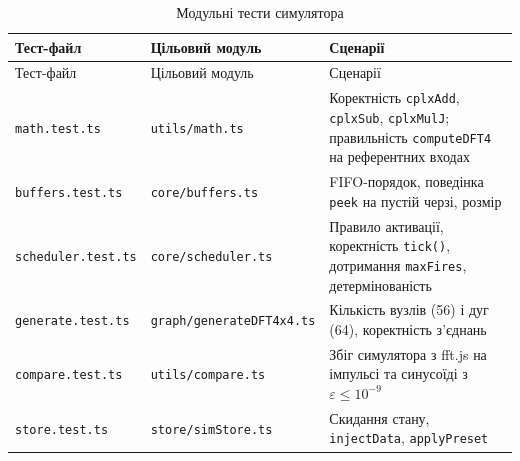 \begin{longtable}[]{@{}
  >{\raggedright\arraybackslash}p{}
  >{\raggedright\arraybackslash}p{}
  >{\raggedright\arraybackslash}p{}@{}}
\caption[Модульні тести симулятора]{Модульні тести симулятора}\tabularnewline
\toprule\noalign{}
\begin{minipage}[b]{\linewidth}\raggedright
Тест-файл
\end{minipage} & \begin{minipage}[b]{\linewidth}\raggedright
Цільовий модуль
\end{minipage} & \begin{minipage}[b]{\linewidth}\raggedright
Сценарії
\end{minipage} \\
\midrule\noalign{}
\endfirsthead
\toprule\noalign{}
\begin{minipage}[b]{\linewidth}\raggedright
Тест-файл
\end{minipage} & \begin{minipage}[b]{\linewidth}\raggedright
Цільовий модуль
\end{minipage} & \begin{minipage}[b]{\linewidth}\raggedright
Сценарії
\end{minipage} \\
\midrule\noalign{}
\endhead
\bottomrule\noalign{}
\endlastfoot
\texttt{math.test.ts} & \texttt{utils/math.ts} & Коректність
\texttt{cplxAdd}, \texttt{cplxSub}, \texttt{cplxMulJ}; правильність
\texttt{computeDFT4} на референтних входах \\
\texttt{buffers.test.ts} & \texttt{core/buffers.ts} & FIFO-порядок,
поведінка \texttt{peek} на пустій черзі, розмір \\
\texttt{scheduler.test.ts} & \texttt{core/scheduler.ts} & Правило
активації, коректність \texttt{tick()}, дотримання \texttt{maxFires},
детермінованість \\
\texttt{generate.test.ts} & \texttt{graph/generateDFT4x4.ts} & Кількість
вузлів (56) і дуг (64), коректність з'єднань \\
\texttt{compare.test.ts} & \texttt{utils/compare.ts} & Збіг симулятора з
fft.js на імпульсі та синусоїді з \(\varepsilon\leq10^{-9}\) \\
\texttt{store.test.ts} & \texttt{store/simStore.ts} & Скидання стану,
\texttt{injectData}, \texttt{applyPreset} \\
\end{longtable}

